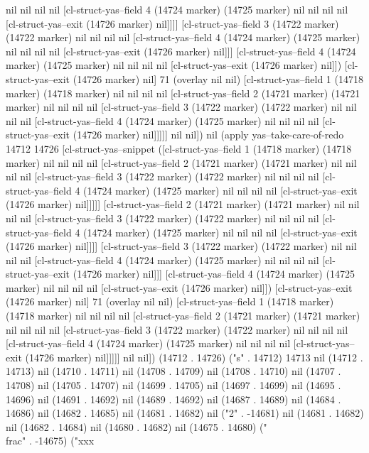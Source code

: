 nil nil nil nil [cl-struct-yas--field 4 (14724 marker) (14725 marker) nil nil nil nil [cl-struct-yas--exit (14726 marker) nil]]]] [cl-struct-yas--field 3 (14722 marker) (14722 marker) nil nil nil nil [cl-struct-yas--field 4 (14724 marker) (14725 marker) nil nil nil nil [cl-struct-yas--exit (14726 marker) nil]]] [cl-struct-yas--field 4 (14724 marker) (14725 marker) nil nil nil nil [cl-struct-yas--exit (14726 marker) nil]]) [cl-struct-yas--exit (14726 marker) nil] 71 (overlay nil nil) [cl-struct-yas--field 1 (14718 marker) (14718 marker) nil nil nil nil [cl-struct-yas--field 2 (14721 marker) (14721 marker) nil nil nil nil [cl-struct-yas--field 3 (14722 marker) (14722 marker) nil nil nil nil [cl-struct-yas--field 4 (14724 marker) (14725 marker) nil nil nil nil [cl-struct-yas--exit (14726 marker) nil]]]]] nil nil]) nil (apply yas--take-care-of-redo 14712 14726 [cl-struct-yas--snippet ([cl-struct-yas--field 1 (14718 marker) (14718 marker) nil nil nil nil [cl-struct-yas--field 2 (14721 marker) (14721 marker) nil nil nil nil [cl-struct-yas--field 3 (14722 marker) (14722 marker) nil nil nil nil [cl-struct-yas--field 4 (14724 marker) (14725 marker) nil nil nil nil [cl-struct-yas--exit (14726 marker) nil]]]]] [cl-struct-yas--field 2 (14721 marker) (14721 marker) nil nil nil nil [cl-struct-yas--field 3 (14722 marker) (14722 marker) nil nil nil nil [cl-struct-yas--field 4 (14724 marker) (14725 marker) nil nil nil nil [cl-struct-yas--exit (14726 marker) nil]]]] [cl-struct-yas--field 3 (14722 marker) (14722 marker) nil nil nil nil [cl-struct-yas--field 4 (14724 marker) (14725 marker) nil nil nil nil [cl-struct-yas--exit (14726 marker) nil]]] [cl-struct-yas--field 4 (14724 marker) (14725 marker) nil nil nil nil [cl-struct-yas--exit (14726 marker) nil]]) [cl-struct-yas--exit (14726 marker) nil] 71 (overlay nil nil) [cl-struct-yas--field 1 (14718 marker) (14718 marker) nil nil nil nil [cl-struct-yas--field 2 (14721 marker) (14721 marker) nil nil nil nil [cl-struct-yas--field 3 (14722 marker) (14722 marker) nil nil nil nil [cl-struct-yas--field 4 (14724 marker) (14725 marker) nil nil nil nil [cl-struct-yas--exit (14726 marker) nil]]]]] nil nil]) (14712 . 14726) ("s" . 14712) 14713 nil (14712 . 14713) nil (14710 . 14711) nil (14708 . 14709) nil (14708 . 14710) nil (14707 . 14708) nil (14705 . 14707) nil (14699 . 14705) nil (14697 . 14699) nil (14695 . 14696) nil (14691 . 14692) nil (14689 . 14692) nil (14687 . 14689) nil (14684 . 14686) nil (14682 . 14685) nil (14681 . 14682) nil ("2" . -14681) nil (14681 . 14682) nil (14682 . 14684) nil (14680 . 14682) nil (14675 . 14680) ("\\frac" . -14675) ("xxx
